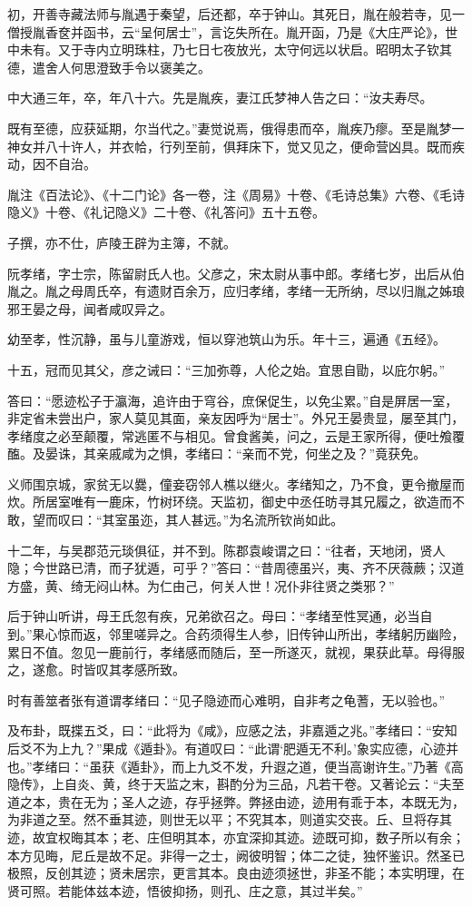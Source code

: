 \documentclass[12pt,UTF8]{ctexbook}
\begin{document}
初，开善寺藏法师与胤遇于秦望，后还都，卒于钟山。其死日，胤在般若寺，见一僧授胤香奁并函书，云“呈何居士”，言讫失所在。胤开函，乃是《大庄严论》，世中未有。又于寺内立明珠柱，乃七日七夜放光，太守何远以状启。昭明太子钦其德，遣舍人何思澄致手令以褒美之。

中大通三年，卒，年八十六。先是胤疾，妻江氏梦神人告之曰：“汝夫寿尽。

既有至德，应获延期，尔当代之。”妻觉说焉，俄得患而卒，胤疾乃瘳。至是胤梦一神女并八十许人，并衣帢，行列至前，俱拜床下，觉又见之，便命营凶具。既而疾动，因不自治。

胤注《百法论》、《十二门论》各一卷，注《周易》十卷、《毛诗总集》六卷、《毛诗隐义》十卷、《礼记隐义》二十卷、《礼答问》五十五卷。

子撰，亦不仕，庐陵王辟为主簿，不就。

阮孝绪，字士宗，陈留尉氏人也。父彦之，宋太尉从事中郎。孝绪七岁，出后从伯胤之。胤之母周氏卒，有遗财百余万，应归孝绪，孝绪一无所纳，尽以归胤之姊琅邪王晏之母，闻者咸叹异之。

幼至孝，性沉静，虽与儿童游戏，恒以穿池筑山为乐。年十三，遍通《五经》。

十五，冠而见其父，彦之诫曰：“三加弥尊，人伦之始。宜思自勖，以庇尔躬。”

答曰：“愿迹松子于瀛海，追许由于穹谷，庶保促生，以免尘累。”自是屏居一室，非定省未尝出户，家人莫见其面，亲友因呼为“居士”。外兄王晏贵显，屡至其门，孝绪度之必至颠覆，常逃匿不与相见。曾食酱美，问之，云是王家所得，便吐飧覆醢。及晏诛，其亲戚咸为之惧，孝绪曰：“亲而不党，何坐之及？”竟获免。

义师围京城，家贫无以爨，僮妾窃邻人樵以继火。孝绪知之，乃不食，更令撤屋而炊。所居室唯有一鹿床，竹树环绕。天监初，御史中丞任昉寻其兄履之，欲造而不敢，望而叹曰：“其室虽迩，其人甚远。”为名流所钦尚如此。

十二年，与吴郡范元琰俱征，并不到。陈郡袁峻谓之曰：“往者，天地闭，贤人隐；今世路已清，而子犹遁，可乎？”答曰：“昔周德虽兴，夷、齐不厌薇蕨；汉道方盛，黄、绮无闷山林。为仁由己，何关人世！况仆非往贤之类邪？”

后于钟山听讲，母王氏忽有疾，兄弟欲召之。母曰：“孝绪至性冥通，必当自到。”果心惊而返，邻里嗟异之。合药须得生人参，旧传钟山所出，孝绪躬历幽险，累日不值。忽见一鹿前行，孝绪感而随后，至一所遂灭，就视，果获此草。母得服之，遂愈。时皆叹其孝感所致。

时有善筮者张有道谓孝绪曰：“见子隐迹而心难明，自非考之龟蓍，无以验也。”

及布卦，既揲五爻，曰：“此将为《咸》，应感之法，非嘉遁之兆。”孝绪曰：“安知后爻不为上九？”果成《遁卦》。有道叹曰：“此谓‘肥遁无不利。’象实应德，心迹并也。”孝绪曰：“虽获《遁卦》，而上九爻不发，升遐之道，便当高谢许生。”乃著《高隐传》，上自炎、黄，终于天监之末，斟酌分为三品，凡若干卷。又著论云：“夫至道之本，贵在无为；圣人之迹，存乎拯弊。弊拯由迹，迹用有乖于本，本既无为，为非道之至。然不垂其迹，则世无以平；不究其本，则道实交丧。丘、旦将存其迹，故宜权晦其本；老、庄但明其本，亦宜深抑其迹。迹既可抑，数子所以有余；本方见晦，尼丘是故不足。非得一之士，阙彼明智；体二之徒，独怀鉴识。然圣已极照，反创其迹；贤未居宗，更言其本。良由迹须拯世，非圣不能；本实明理，在贤可照。若能体兹本迹，悟彼抑扬，则孔、庄之意，其过半矣。”
\end{document}
